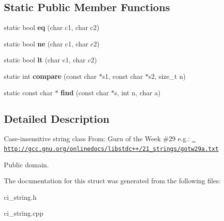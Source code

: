 \subsection*{Static Public Member Functions}
\begin{DoxyCompactItemize}
\item 
\mbox{\label{structci__char__traits_a99c333a8a8ff98833313f46910f99180}} 
static bool {\bfseries eq} (char c1, char c2)
\item 
\mbox{\label{structci__char__traits_a1b321535b406ca4474b766a6b1b3a571}} 
static bool {\bfseries ne} (char c1, char c2)
\item 
\mbox{\label{structci__char__traits_a96e410cf9909522743e81a2f8ed49538}} 
static bool {\bfseries lt} (char c1, char c2)
\item 
\mbox{\label{structci__char__traits_abbc18f82dec4f3a6a94ab9c76050cd42}} 
static int {\bfseries compare} (const char $\ast$s1, const char $\ast$s2, size\+\_\+t n)
\item 
\mbox{\label{structci__char__traits_add24ca891cf501035770dc681bb34de6}} 
static const char $\ast$ {\bfseries find} (const char $\ast$s, int n, char a)
\end{DoxyCompactItemize}


\subsection{Detailed Description}
Case-\/insensitive string class From\+: Guru of the Week \#29 e.\+g.\+: \href{http://gcc.gnu.org/onlinedocs/libstdc++/21_strings/gotw29a.txt}{\texttt{ http\+://gcc.\+gnu.\+org/onlinedocs/libstdc++/21\+\_\+strings/gotw29a.\+txt}}

Public domain. 

The documentation for this struct was generated from the following files\+:\begin{DoxyCompactItemize}
\item 
ci\+\_\+string.\+h\item 
ci\+\_\+string.\+cpp\end{DoxyCompactItemize}

